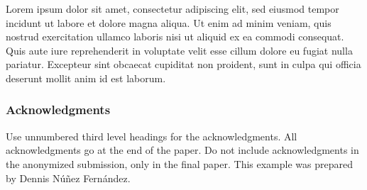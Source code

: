 \documentclass{article}
\begin{document}
Lorem ipsum dolor sit amet, consectetur adipiscing elit, sed eiusmod tempor incidunt ut labore et dolore magna aliqua. Ut enim ad minim veniam, quis nostrud exercitation ullamco laboris nisi ut aliquid ex ea commodi consequat. Quis aute iure reprehenderit in voluptate velit esse cillum dolore eu fugiat nulla pariatur. Excepteur sint obcaecat cupiditat non proident, sunt in culpa qui officia deserunt mollit anim id est laborum.



\subsubsection*{Acknowledgments}

Use unnumbered third level headings for the acknowledgments. All acknowledgments go at the end of the paper. Do not include acknowledgments in the anonymized submission, only in the final paper. This example was prepared by Dennis Núñez Fernández.



{}

\end{document}
